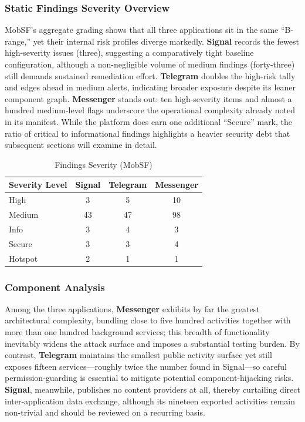 \documentclass[a4paper,12pt]{report}
\begin{document}
\subsubsection{Static Findings Severity Overview}
MobSF’s aggregate grading shows that all three applications sit in the same “B-range,” yet their internal risk profiles diverge markedly. \textbf{Signal} records the fewest high-severity issues (three), suggesting a comparatively tight baseline configuration, although a non-negligible volume of medium findings (forty-three) still demands sustained remediation effort. \textbf{Telegram} doubles the high-risk tally and edges ahead in medium alerts, indicating broader exposure despite its leaner component graph. \textbf{Messenger} stands out: ten high-severity items and almost a hundred medium-level flags underscore the operational complexity already noted in its manifest. While the platform does earn one additional “Secure” mark, the ratio of critical to informational findings highlights a heavier security debt that subsequent sections will examine in detail.

\begin{table}[htbp]
  \centering
  \caption{Findings Severity (MobSF)}
  \label{tab:findings-severity}
  \begin{tabular}{|l|c|c|c|}
    \hline
    \textbf{Severity Level} & \textbf{Signal} & \textbf{Telegram} & \textbf{Messenger} \\ \hline
    High & 3 & 5 & 10 \\ \hline
    Medium & 43 & 47 & 98 \\ \hline
    Info & 3 & 4 & 3 \\ \hline
    Secure & 3 & 3 & 4 \\ \hline
    Hotspot & 2 & 1 & 1 \\ \hline
  \end{tabular}
\end{table}


\subsubsection{Component Analysis}

Among the three applications, \textbf{Messenger} exhibits by far
 the greatest architectural complexity, bundling close to five
  hundred activities together with more than one hundred background
  services; this breadth of functionality inevitably widens the attack
  surface and imposes a substantial testing burden. By contrast,
   \textbf{Telegram} maintains the smallest public activity surface yet
   still exposes fifteen services—roughly twice the number found in Signal—so
    careful permission-guarding is essential to mitigate potential
     component-hijacking risks. \textbf{Signal}, meanwhile, publishes
      no content providers at all, thereby curtailing direct inter-application
      data exchange, although its nineteen exported activities remain non-trivial
      and should be reviewed on a recurring basis.
\end{document}
